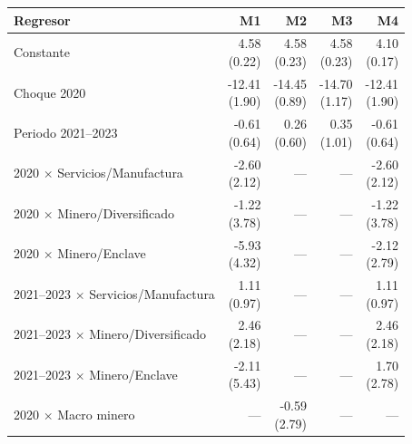 \begin{tabular}{lrrrr}
\toprule
Regresor & M1 & M2 & M3 & M4 \\
\midrule
Constante & \shortstack{4.58 \\ (0.22)} & \shortstack{4.58 \\ (0.23)} & \shortstack{4.58 \\ (0.23)} & \shortstack{4.10 \\ (0.17)} \\
Choque 2020 & \shortstack{-12.41 \\ (1.90)} & \shortstack{-14.45 \\ (0.89)} & \shortstack{-14.70 \\ (1.17)} & \shortstack{-12.41 \\ (1.90)} \\
Periodo 2021--2023 & \shortstack{-0.61 \\ (0.64)} & \shortstack{0.26 \\ (0.60)} & \shortstack{0.35 \\ (1.01)} & \shortstack{-0.61 \\ (0.64)} \\
2020 $\times$ Servicios/Manufactura & \shortstack{-2.60 \\ (2.12)} & --- & --- & \shortstack{-2.60 \\ (2.12)} \\
2020 $\times$ Minero/Diversificado & \shortstack{-1.22 \\ (3.78)} & --- & --- & \shortstack{-1.22 \\ (3.78)} \\
2020 $\times$ Minero/Enclave & \shortstack{-5.93 \\ (4.32)} & --- & --- & \shortstack{-2.12 \\ (2.79)} \\
2021--2023 $\times$ Servicios/Manufactura & \shortstack{1.11 \\ (0.97)} & --- & --- & \shortstack{1.11 \\ (0.97)} \\
2021--2023 $\times$ Minero/Diversificado & \shortstack{2.46 \\ (2.18)} & --- & --- & \shortstack{2.46 \\ (2.18)} \\
2021--2023 $\times$ Minero/Enclave & \shortstack{-2.11 \\ (5.43)} & --- & --- & \shortstack{1.70 \\ (2.78)} \\
2020 $\times$ Macro minero & --- & \shortstack{-0.59 \\ (2.79)} & --- & --- \\

\end{tabular}

